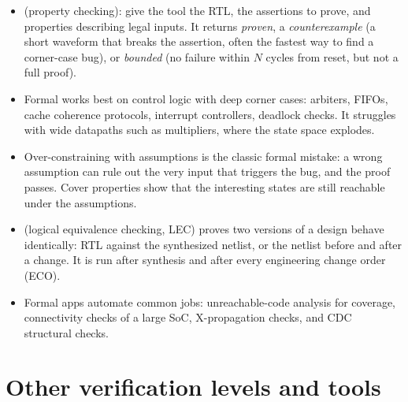 \begin{itemize}
  \item {} (property checking): give the tool the RTL, the assertions to prove, and  properties describing legal inputs. It returns \emph{proven}, a \emph{counterexample} (a short waveform that breaks the assertion, often the fastest way to find a corner-case bug), or \emph{bounded} (no failure within $N$ cycles from reset, but not a full proof).
  \item Formal works best on control logic with deep corner cases: arbiters, FIFOs, cache coherence protocols, interrupt controllers, deadlock checks. It struggles with wide datapaths such as multipliers, where the state space explodes.
  \item Over-constraining with assumptions is the classic formal mistake: a wrong assumption can rule out the very input that triggers the bug, and the proof passes. Cover properties show that the interesting states are still reachable under the assumptions.
  \item {} (logical equivalence checking, LEC) proves two versions of a design behave identically: RTL against the synthesized netlist, or the netlist before and after a change. It is run after synthesis and after every engineering change order (ECO).
  \item Formal apps automate common jobs: unreachable-code analysis for coverage, connectivity checks of a large SoC, X-propagation checks, and CDC structural checks.
\end{itemize}

\section{Other verification levels and tools}

